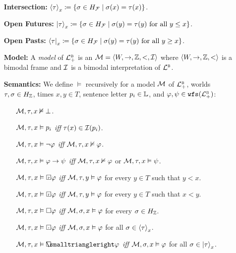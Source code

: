 \documentclass[a4paper, 11pt]{article} %
\begin{document}
\begin{enumerate}[leftmargin=1.2in]
\begin{multicols}{2}
\begin{enumerate}
        \item[\it Could Always:] $\Could\varphi \coloneq \inevitably\Future\varphi$.
        \item[\it Could Eventually:] $\could\varphi \coloneq \inevitably\future\varphi$.
      \end{enumerate}
    \end{multicols}
  \item[\bf Intersection:] $\left\langle\tau\right\rangle_x \coloneq \lbrace\sigma \in H_{\mathcal{F}} \mid \sigma(x) = \tau(x)\rbrace$.
  \item[\bf Open Futures:] $\left|\tau\right\rangle_x \coloneq \lbrace\sigma \in H_{\mathcal{F}} \mid \sigma(y) = \tau(y) \text{ for all } y \leq x\rbrace$.
  \item[\bf Open Pasts:] $\left\langle\tau\right|_x \coloneq \lbrace\sigma \in H_{\mathcal{F}} \mid \sigma(y) = \tau(y) \text{ for all } y \geq x\rbrace$.
  \item[\bf Model:] A \textit{model} of $\mathcal{L}^{\textsc{b}}_+$ is an $\mathcal{M} = \langle W, \to, \mathbb{Z}, <, \mathcal{I}\rangle$ where $\langle W, \to, \mathbb{Z}, <\rangle$ is a bimodal frame and $\mathcal{I}$ is a bimodal interpretation of $\mathcal{L}^{\textsc{b}}$.
  \item[\bf Semantics:] We define $\vDash$ recursively for a model $\mathcal{M}$ of $\mathcal{L}^{\textsc{b}}_+$, worlds $\tau, \sigma \in H_{\mathbb{Z}}$, times $x, y \in T$, sentence letter $p_i \in \mathbb{L}$, and $\varphi, \psi \in \texttt{wfs}(\mathcal{L}^{\textsc{b}}_+)$:
    \begin{itemize}[leftmargin=.15in]\small
      \item[] $\mathcal{M}, \tau, x \nvDash \bot$.
      \item[] $\mathcal{M}, \tau, x \vDash p_i$ \textit{iff} $\tau(x) \in \mathcal{I}(p_i)$.
      \item[] $\mathcal{M}, \tau, x \vDash \neg \varphi$ \textit{iff} $\mathcal{M}, \tau, x\nvDash \varphi$.
      \item[] $\mathcal{M}, \tau, x \vDash \varphi\rightarrow \psi$ \textit{iff} $\mathcal{M}, \tau, x\nvDash \varphi$ or $\mathcal{M}, \tau, x \vDash  \psi$.
      \item[] $\M, \tau, x \vDash \Past \metaA$ \textit{iff} $\mathcal{M}, \tau, y\vDash \varphi$ for every $y \in T$ such that $y < x$.
      \item[] $\M, \tau, x \vDash \Future \metaA$ \textit{iff} $\mathcal{M}, \tau, y\vDash \varphi$ for every $y \in T$ such that $x < y$.
      \item[] $\mathcal{M}, \tau, x \vDash \Box \varphi$ \textit{iff} $\mathcal{M}, \sigma, x\vDash \varphi$ for every $\sigma \in H_{\mathbb{Z}}$.
      \item[] $\M,\tau,x \vDash \Inevitably \varphi$ \textit{iff} $\mathcal{M},\sigma,x \vDash \varphi$ for all $\sigma \in \left\langle\tau\right\rangle_x$.
      \item[] $\M,\tau,x \vDash \Openfuture \varphi$ \textit{iff} $\mathcal{M},\sigma,x \vDash \varphi$ for all $\sigma \in \left|\tau\right\rangle_x$.

\end{itemize}
\end{enumerate}
\end{document}
